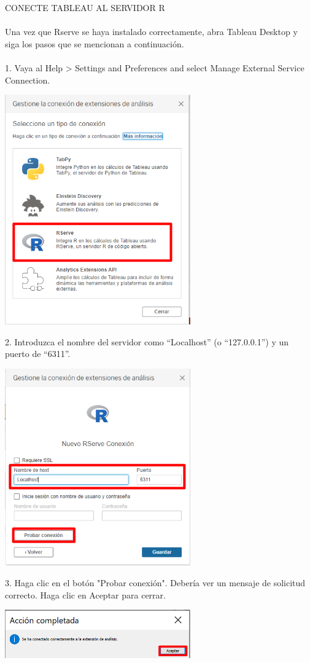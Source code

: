 \documentclass[12pt,letterpaper]{article}
\begin{document}
CONECTE TABLEAU AL SERVIDOR R
\\\\Una vez que Rserve se haya instalado correctamente, abra Tableau Desktop y siga los pasos que se
mencionan a continuación.
\\\\1. Vaya al Help > Settings and Preferences and select Manage External
Service Connection.
\begin{center}
    \includegraphics[width=8cm]{img/73.png}  
\end{center}
2. Introduzca el nombre del servidor como “Localhost” (o “127.0.0.1”) y un puerto de “6311”.
\begin{center}
    \includegraphics[width=8cm]{img/74.png}  
\end{center}
3. Haga clic en el botón "Probar conexión". Debería ver un mensaje de solicitud correcto. Haga
clic en Aceptar para cerrar.
\begin{center}
    \includegraphics[width=8cm]{img/75.png}  
\end{center}
\end{document}
